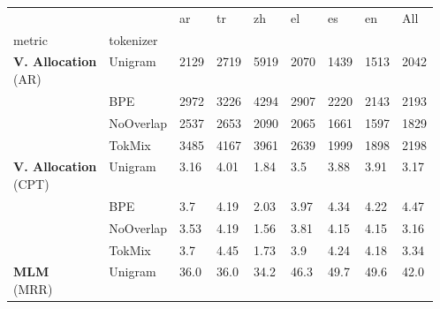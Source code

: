 \begin{table*}
\centering
\small
\begin{tabular}{lllllllll}
\toprule
     &        &                ar &                tr &                zh &                el &                es &                en &               All \\
metric & tokenizer &                   &                   &                   &                   &                   &                   &                   \\
\midrule
\multirowcell{4}[0pt][l]{\textbf{V. Allocation} \\ (AR)} & Unigram &              2129 &              2719 &              5919 &              2070 &              1439 &              1513 &              2042 \\
     & BPE &              2972 &              3226 &              4294 &              2907 &              2220 &              2143 &              2193 \\
     & NoOverlap &              2537 &              2653 &              2090 &              2065 &              1661 &              1597 &              1829 \\
     & TokMix &              3485 &              4167 &              3961 &              2639 &              1999 &              1898 &              2198 \\
\cline{1-9}
\multirowcell{4}[0pt][l]{\textbf{V. Allocation} \\ (CPT)} & Unigram &              3.16 &              4.01 &              1.84 &               3.5 &              3.88 &              3.91 &              3.17 \\
     & BPE &               3.7 &              4.19 &              2.03 &              3.97 &              4.34 &              4.22 &              4.47 \\
     & NoOverlap &              3.53 &              4.19 &              1.56 &              3.81 &              4.15 &              4.15 &              3.16 \\
     & TokMix &               3.7 &              4.45 &              1.73 &               3.9 &              4.24 &              4.18 &              3.34 \\
\cline{1-9}
\multirowcell{4}[0pt][l]{\textbf{MLM} \\ (MRR)} & Unigram &              36.0 &              36.0 &              34.2 &              46.3 &              49.7 &              49.6 &              42.0 \\

\end{tabular}
\end{table*}
